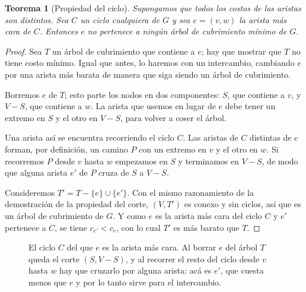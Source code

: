 \documentclass[12pt, spanish, oneside, openany]{book}
\theoremstyle{uprightplain}
\newtheorem{teorema}{Teorema}[section]
\theoremstyle{definition}
\theoremstyle{remark}
\theoremstyle{definition}
\begin{document}
\begin{teorema}[Propiedad del ciclo]
\label{teo:ciclo}
Supongamos que todos los costos de las aristas son distintos. Sea $C$ un ciclo cualquiera de $G$ y sea $e=(v,w)$ la arista más cara de $C$. Entonces $e$ no pertenece a ningún árbol de cubrimiento mínimo de $G$.
\end{teorema}
\begin{proof}
Sea $T$ un árbol de cubrimiento que contiene a $e$; hay que mostrar que $T$ no tiene costo mínimo. Igual que antes, lo haremos con un intercambio, cambiando $e$ por una arista más barata de manera que siga siendo un árbol de cubrimiento.

Borremos $e$ de $T$; esto parte los nodos en dos componentes: $S$, que contiene a $v$, y $V-S$, que contiene a $w$. La arista que usemos en lugar de $e$ debe tener un extremo en $S$ y el otro en $V-S$, para volver a coser el árbol.

Una arista así se encuentra recorriendo el ciclo $C$. Las aristas de $C$ distintas de $e$ forman, por definición, un camino $P$ con un extremo en $v$ y el otro en $w$. Si recorremos $P$ desde $v$ hasta $w$ empezamos en $S$ y terminamos en $V-S$, de modo que alguna arista $e'$ de $P$ cruza de $S$ a $V-S$.

Consideremos $T'=T-\{e\}\cup\{e'\}$. Con el mismo razonamiento de la demostración de la propiedad del corte, $(V,T')$ es conexo y sin ciclos, así que es un árbol de cubrimiento de $G$. Y como $e$ es la arista más cara del ciclo $C$ y $e'$ pertenece a $C$, se tiene $c_{e'}<c_e$, con lo cual $T'$ es más barato que $T$.
\end{proof}

\begin{figure}[H]
\centering
{}
\caption{El ciclo $C$ del que $e$ es la arista más cara. Al borrar $e$ del árbol
$T$ queda el corte $(S,V-S)$, y al recorrer el resto del ciclo desde $v$ hasta
$w$ hay que cruzarlo por alguna arista: acá es $e'$, que cuesta menos que $e$ y
por lo tanto sirve para el intercambio.}
\label{fig:propiedad-ciclo}
\end{figure}
\end{document}

